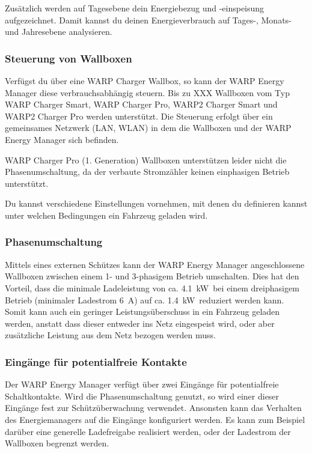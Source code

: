 \documentclass[a4paper,10pt]{article}
\newcommand{\hint}[1]{\begin{tcolorbox}[colback=boxgray,colframe=black,coltext=
white,title=Hinweis,left*=2mm,right*=2mm,boxsep=1mm,bottom=1mm,top=1mm]#1\end{tcolorbox}}
\begin{document}
\begin{multicols*}{2}
	Zusätzlich werden auf Tagesebene dein Energiebezug und -einspeisung
	aufgezeichnet. Damit kannst du deinen Energieverbrauch auf Tages-, Monats- und
	Jahresebene analysieren.

	\subsubsection{Steuerung von Wallboxen}
	Verfügst du über eine WARP Charger Wallbox, so kann der WARP Energy Manager
	diese verbrauchsabhängig steuern. Bis zu XXX Wallboxen vom Typ WARP Charger Smart, 
	WARP Charger Pro, WARP2 Charger Smart und WARP2 Charger Pro werden unterstützt. Die
	Steuerung erfolgt über ein gemeinsames Netzwerk (LAN, WLAN) in dem die
	Wallboxen und der WARP Energy Manager sich befinden.

	\hint{WARP Charger Pro (1. Generation) Wallboxen unterstützen leider nicht die
	Phasenumschaltung, da der verbaute Stromzähler keinen einphasigen Betrieb
	unterstützt.}

	Du kannst verschiedene Einstellungen vornehmen, mit denen du definieren
	kannst unter welchen Bedingungen ein Fahrzeug geladen wird.

	\subsubsection{Phasenumschaltung}
	Mittels eines externen Schützes kann der WARP Energy Manager
	angeschlossene Wallboxen zwischen einem 1- und 3-phasigem Betrieb
	umschalten. 
	Dies hat den Vorteil, dass die minimale Ladeleistung von ca.
	\SI{4.1}{\kilo\watt}~bei einem dreiphasigem Betrieb (minimaler Ladestrom
	\SI{6}{\ampere}) auf ca. \SI{1.4}{\kilo\watt}~reduziert werden kann. Somit
	kann auch ein geringer Leistungsüberschuss in ein Fahrzeug geladen werden,
	anstatt dass dieser entweder ins Netz eingespeist wird, oder aber
	zusätzliche Leistung aus dem Netz bezogen werden muss.

	\subsubsection{Eingänge für potentialfreie Kontakte}
	Der WARP Energy Manager verfügt über zwei Eingänge für potentialfreie
	Schaltkontakte. Wird die Phasenumschaltung genutzt, so wird einer dieser
	Eingänge fest zur Schützüberwachung verwendet. Ansonsten kann das Verhalten
	des Energiemanagers auf die Eingänge konfiguriert werden. Es kann zum
	Beispiel darüber eine generelle Ladefreigabe realisiert werden, oder der
	Ladestrom der Wallboxen begrenzt werden.


\end{multicols*}
\end{document}
